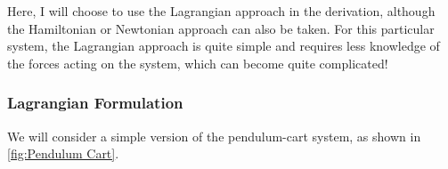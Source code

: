 Here, I will choose to use the \gls{Lagrangian} approach in the derivation, although the \gls{Hamiltonian} or Newtonian approach can also be taken. For this particular system, the \gls{Lagrangian} approach is quite simple and requires less knowledge of the forces acting on the system, which can become quite complicated! 

\subsubsection{Lagrangian Formulation}

We will consider a simple version of the pendulum-cart system, as shown in \autoref{fig:Pendulum Cart}.

\begin{figure}[ht]
    \centering




\begin{tikzpicture}[x=0.75pt,y=0.75pt,yscale=-1,xscale=1]


\end{tikzpicture}
\end{figure}
